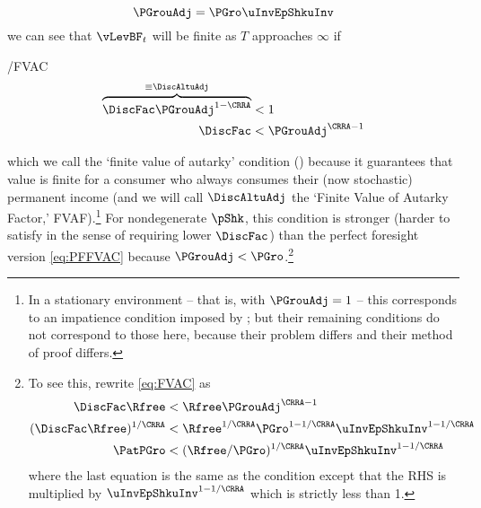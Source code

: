 \documentclass[BufferStockTheory]{subfiles}
\begin{document}
\begin{equation}
  \label{eq:PGrouAdj}
  \PGrouAdj = \PGro \uInvEpShkuInv 
\end{equation}
we can see that $\vLevBF_{t}$ will be finite 
as $T$ approaches $\infty$ if\hypertarget{FVAC}{}
\begin{verbatimwrite}{\EqDir/FVAC}
  \begin{align}
    \overbrace{\DiscFac \PGrouAdj^{1-\CRRA} }^{\equiv \DiscAltuAdj}  & < 1 \notag
    \\ \DiscFac  & < \PGrouAdj^{\CRRA-1} \label{eq:FVAC}
  \end{align}
\end{verbatimwrite}

which we call the `finite value of autarky' \hypertarget{FVAF}{}
condition (\FVAC) because it guarantees that value is finite for a consumer who always consumes their 
(now stochastic) permanent income (and we will call $\DiscAltuAdj$ the `Finite Value of Autarky Factor,' FVAF).\footnote{In a stationary environment -- that is, with $\PGrouAdj=1$ -- this corresponds to an impatience condition imposed by \cite{mstIncFluct}; but their remaining conditions do not correspond to those here, because their problem differs and their method of proof differs.}  For nondegenerate $\pShk$, this 
condition is stronger
(harder to satisfy in the sense of requiring lower $\DiscFac$) than
the perfect foresight version \eqref{eq:PFFVAC} because $\PGrouAdj <
\PGro$.\footnote{To see this, rewrite \eqref{eq:FVAC} as 
  \begin{align*}
    \DiscFac \Rfree & < \Rfree \PGrouAdj^{\CRRA-1}
    \\ (\DiscFac \Rfree)^{1/\CRRA}  & < \Rfree^{1/\CRRA} \PGro^{1-1/\CRRA} \uInvEpShkuInv^{1-1/\CRRA}
    \\ \PatPGro & < (\Rfree/\PGro)^{1/\CRRA} \uInvEpShkuInv^{1-1/\CRRA}
  \end{align*}
  where the last equation is the same as the {\PFFVAC} condition except that the 
  RHS is multiplied by $\uInvEpShkuInv^{1-1/\CRRA}$ which is strictly less than 1.}

\begin{comment}
  A useful alternative version is
  \begin{verbatimwrite}{\EqDir/FVACAlt}
    \begin{align}
      \DiscFac \Rfree \PGro^{-\CRRA} \uInvEpShkuInv^{1-\CRRA}   & < \Rfree/\PGro \nonumber
      \\ \PatPGro \uInvEpShkuInv^{1/\CRRA-1}  & < (\Rfree/\PGro)^{1/\CRRA} \label{eq:FVACAlt}.
    \end{align}
  \end{verbatimwrite}
  
\end{comment}
\end{document}
